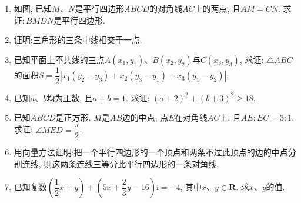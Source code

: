 \documentclass[10pt,a4paper]{article}
\begin{document}
\begin{enumerate}[1.]
\item 如图, 已知$M$、$N$是平行四边形$ABCD$的对角线$AC$上的两点, 且$AM=CN$. 求证$: BMDN$是平行四边形.
\begin{center}
\end{center}
\item 证明:三角形的三条中线相交于一点.
\item 已知平面上不共线的三点$A(x_1, y_1)$、$B(x_2, y_2)$与$C(x_3, y_3)$, 求证: $\triangle ABC$的面积$S=\dfrac 12|x_1(y_2-y_3)+x_2(y_3-y_1)+x_3(y_1-y_2)|$.
\item 已知$a$、$b$均为正数, 且$a+b=1$. 求证: $(a+2)^2+(b+3)^2\ge 18$.
\item 已知$ABCD$是正方形, $M$是$AB$边的中点, 点$E$在对角线$AC$上, 且$AE: EC=3: 1$. 求证: $\angle MED=\dfrac \pi 2$.
\item 用向量方法证明:把一个平行四边形的一个顶点和两条不过此顶点的边的中点分别连线, 则这两条连线三等分此平行四边形的一条对角线.
\item 已知复数$(\dfrac 12x+y)+(5x+\dfrac 23y-16)\mathrm{i}=-4$, 其中$x$、$y\in \mathbf{R}$. 求$x$、$y$的值.




\iffalse













\end{enumerate}
\end{document}
